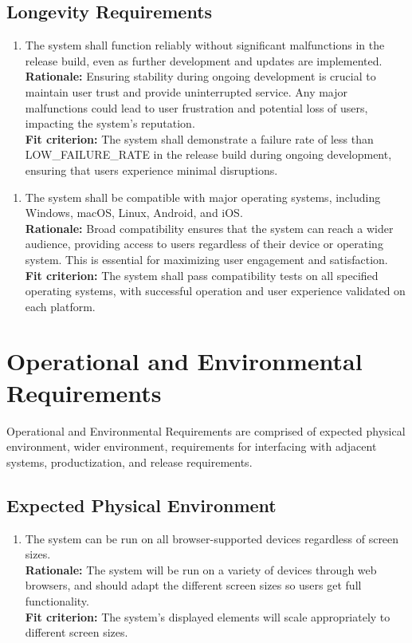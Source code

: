 \documentclass[12pt]{article}
\begin{document}
\subsection{Longevity Requirements}
\begin{enumerate}[label={PR-LR}1. ]
  \item The system shall function reliably without significant malfunctions in the release build, even as further development and updates are implemented.\\
  \textbf{Rationale: }Ensuring stability during ongoing development is crucial to maintain user trust and provide uninterrupted service. Any major malfunctions could lead to user frustration and potential loss of users, impacting the system's reputation.\\
  \textbf{Fit criterion: }The system shall demonstrate a failure rate of less than LOW\_FAILURE\_RATE in the release build during ongoing development, ensuring that users experience minimal disruptions.  
\end{enumerate}
\begin{enumerate}[label={PR-LR}2. ]
  \item The system shall be compatible with major operating systems, including Windows, macOS, Linux, Android, and iOS.\\
  \textbf{Rationale: }Broad compatibility ensures that the system can reach a wider audience, providing access to users regardless of their device or operating system. This is essential for maximizing user engagement and satisfaction.\\
  \textbf{Fit criterion: }The system shall pass compatibility tests on all specified operating systems, with successful operation and user experience validated on each platform.  
\end{enumerate}

\newpage

\section{Operational and Environmental Requirements}
\hspace{2em}Operational and Environmental Requirements are comprised of expected physical environment, wider environment, requirements for interfacing with adjacent systems, productization, and release requirements.
\subsection{Expected Physical Environment}
\begin{enumerate}[label={OE-EPE\arabic*}. ]
  \item The system can be run on all browser-supported devices regardless of screen sizes.\\
  \textbf{Rationale: }The system will be run on a variety of devices through web browsers, and should adapt the different screen sizes so users get full functionality.\\
  \textbf{Fit criterion: }The system's displayed elements will scale appropriately to different screen sizes.
\end{enumerate}
\end{document}

